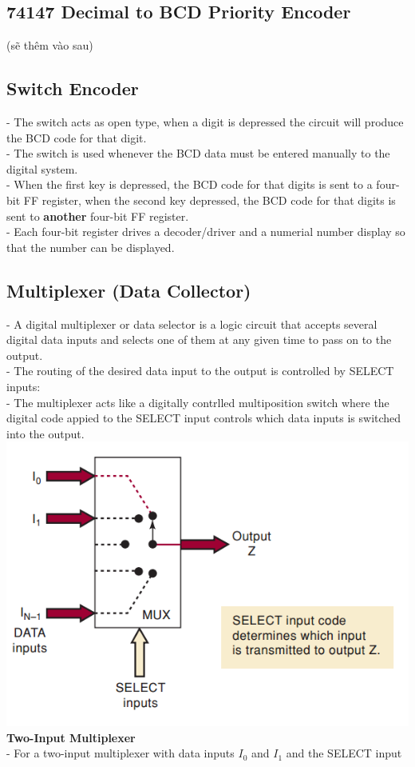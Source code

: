 \documentclass[12pt]{article}
\begin{document}
\subsection{74147 Decimal to BCD Priority Encoder}
(sẽ thêm vào sau)
\subsection{Switch Encoder}
- The switch acts as open type, when a digit is depressed the circuit will produce the BCD code for that digit. \\
- The switch is used whenever the BCD data must be entered manually to the digital system. \\
- When the first key is depressed, the BCD code for that digits is sent to a four-bit FF register, when the second key depressed, the BCD code for that digits is sent to \textbf{another} four-bit FF register. \\
- Each four-bit register drives a decoder/driver and a numerial number display so that the number can be displayed. \\



\subsection{Multiplexer (Data Collector)}
- A digital multiplexer or data selector is a logic circuit that accepts several digital data inputs and selects one of them at any given time to pass on to the output. \\
- The routing of the desired data input to the output is controlled by SELECT inputs: \\
- The multiplexer acts like  a digitally contrlled multiposition switch where the digital code appied to the SELECT input controls which data inputs is switched into the output. \\
\includegraphics[scale = 0.7]{hinh63}
\bigbreak
\textbf{Two-Input Multiplexer} \\
- For a two-input multiplexer with data inputs $I_{0}$ and $I_1$ and the SELECT input
\end{document}
